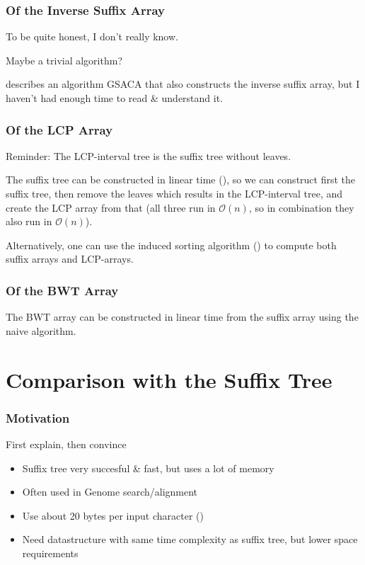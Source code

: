 \documentclass[compress,handout]{beamer} %
\renewcommand{\O}{\mathcal{O}}
\begin{document}
\begin{frame}
	\frametitle{Of the Inverse Suffix Array}
	To be quite honest, I don't really know.

	Maybe a trivial algorithm?

	\cite{baier2015linear} describes an algorithm GSACA that also
	constructs the inverse suffix array, but I haven't had enough
	time to read \& understand it.
\end{frame}

\begin{frame}
	\frametitle{Of the LCP Array}
	Reminder: The LCP-interval tree is the suffix tree without leaves.

	The suffix tree can be constructed in linear time
	(\cite{giegerich1997ukkonen}), so we can construct first
	the suffix tree, then remove the leaves which results in the
	LCP-interval tree, and create the LCP array from that (all three
	run in $\O(n)$, so in combination they also run in $\O(n)$).

	Alternatively, one can use the induced sorting algorithm
	(\cite{fischer2011inducing}) to compute both suffix arrays
	and LCP-arrays.
\end{frame}

\begin{frame}
	\frametitle{Of the BWT Array}
	The BWT array can be constructed in linear time from the suffix
	array using the naive algorithm.
\end{frame}

\section{Comparison with the Suffix Tree}

\begin{frame}
	\frametitle{Motivation}
	First explain, then convince

	\begin{itemize}
		\item Suffix tree very succesful \& fast, but uses a lot of memory
		\item Often used in Genome search/alignment
		\item Use about 20 bytes per input character (\cite{kurtz1999reducing})
		\item Need datastructure with same time complexity as suffix tree, but lower space requirements
	\end{itemize}
\end{frame}
\end{document}
